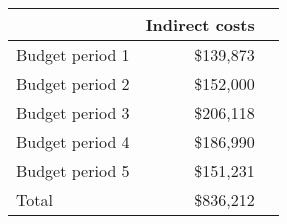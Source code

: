 \begin{tabular}{lrr}
\hline
{} & Indirect costs    \\
  \hline
  Budget period 1 &         \$139,873      \\
  Budget period 2 &       \$152,000     \\
  Budget period 3 &         \$206,118      \\
  Budget period 4 &         \$186,990     \\
  Budget period 5 &        \$151,231     \\\hline
  Total           &             \$836,212  \\
  \hline
\end{tabular}

